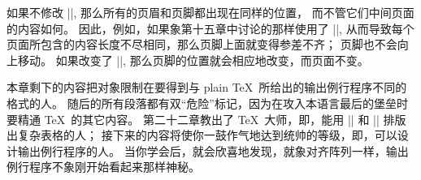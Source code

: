\danger 如果不修改 |\vsize|, 那么所有的页眉和页脚都出现在同样的位置，
而不管它们中间页面的内容如何。%
因此，例如，如果象第十五章中讨论的那样使用了 |\raggedbottom|,
从而导致每个页面所包含的内容长度不尽相同，那么页脚上面就变得参差不齐；
页脚也不会向上移动。%
如果改变了 |\vsize|, 那么页脚的位置就会相应地改变，而页面不变。

\ddanger 本章剩下的内容把对象限制在要得到与 plain \TeX\ 所给出的输出例行程序不同的格式的人。
随后的所有段落都有双``危险''标记，因为在攻入本语言最后的堡垒时要精通 \TeX\ 的其它内容。
第二十二章教出了 \TeX\ 大师，即，能用 |\halign| 和 |\valign| 排版出复杂表格的人；
接下来的内容将使你一鼓作气地达到统帅的等级，即，可以设计输出例行程序的人。
当你学会后，就会欣喜地发现，就象对齐阵列一样，输出例行程序不象刚开始看起来那样神秘。

